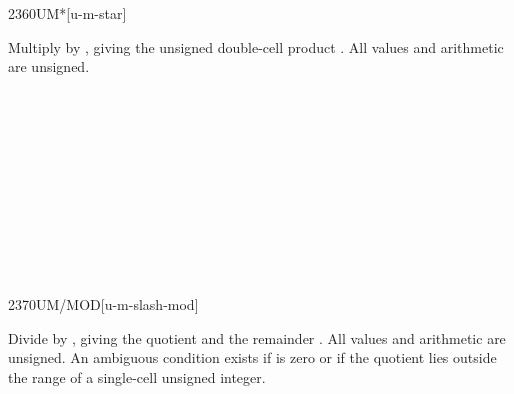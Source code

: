 \pagebreak
\begin{worddef}{2360}{UM*}[u-m-star]
\item {}

	Multiply  by , giving the unsigned double-cell
	product . All values and arithmetic are unsigned.

	\begin{testing} %
		 \\
		 \\
		 \\
		 \\
		 \\

		 \\
		 \\
		 \\
		 \\
	\end{testing}
\end{worddef}


\begin{worddef}{2370}{UM/MOD}[u-m-slash-mod]
\item {}

	Divide  by , giving the quotient 
	and the remainder . All values and arithmetic are
	unsigned. An ambiguous condition exists if  is zero or
	if the quotient lies outside the range of a single-cell unsigned
	integer.


	\begin{testing} %
		 \\
		 \\
		 \\
		 \\
		 \\
		 \\
	\end{testing}
\end{worddef}


